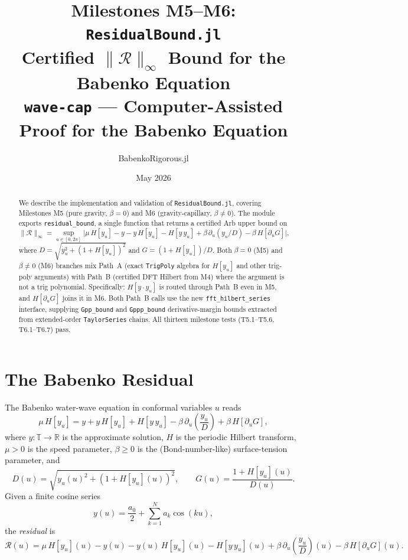 \documentclass[11pt]{article}
\title{\textbf{Milestones M5--M6: \texttt{ResidualBound.jl}}\\[0.4em]
\large Certified $\|\mathcal{R}\|_\infty$ Bound for the Babenko Equation\\[0.2em]
\normalsize \texttt{wave-cap} --- Computer-Assisted Proof for the Babenko Equation}
\author{BabenkoRigorous.jl}
\date{May 2026}
\theoremstyle{definition}
\begin{document}
\maketitle

\begin{abstract}
We describe the implementation and validation of \texttt{ResidualBound.jl},
covering Milestones M5 (pure gravity, $\beta=0$) and M6 (gravity-capillary, $\beta\neq 0$).
The module exports \texttt{residual\_bound}, a single function that returns a certified
Arb upper bound on
\[
  \|\mathcal{R}\|_\infty
  = \sup_{u\in[0,2\pi]}
  \bigl|\mu\,H[y_u] - y - y\,H[y_u] - H[y\,y_u]
  + \beta\,\partial_u(y_u/D) - \beta\,H[\partial_u G]\bigr|,
\]
where $D = \sqrt{y_u^2+(1+H[y_u])^2}$ and $G=(1+H[y_u])/D$.
Both $\beta = 0$ (M5) and $\beta \neq 0$ (M6) branches mix Path~A (exact
\texttt{TrigPoly} algebra for $H[y_u]$ and other trig-poly arguments) with
Path~B (certified DFT Hilbert from M4) where the argument is not a trig
polynomial.  Specifically: $H[y\cdot y_u]$ is routed through Path~B even in
M5, and $H[\partial_u G]$ joins it in M6.  Both Path~B calls use the new
\texttt{fft\_hilbert\_series} interface, supplying \texttt{Gpp\_bound} and
\texttt{Gppp\_bound} derivative-margin bounds extracted from extended-order
\texttt{TaylorSeries} chains.  All thirteen milestone tests
(T5.1--T5.6, T6.1--T6.7) pass.
\end{abstract}

\tableofcontents
\bigskip

\section{The Babenko Residual}

The Babenko water-wave equation in conformal variables $u$ reads
\begin{equation}\label{eq:babenko}
  \mu\,H[y_u] = y + y\,H[y_u] + H[y\,y_u]
  - \beta\,\partial_u\!\left(\frac{y_u}{D}\right)
  + \beta\,H\!\left[\partial_u G\right],
\end{equation}
where $y:\mathbb{T}\to\mathbb{R}$ is the approximate solution, $H$ is the periodic
Hilbert transform, $\mu>0$ is the speed parameter, $\beta\geq 0$ is the (Bond-number-like)
surface-tension parameter, and
\[
  D(u) = \sqrt{y_u(u)^2 + (1+H[y_u](u))^2}, \qquad
  G(u) = \frac{1+H[y_u](u)}{D(u)}.
\]
Given a finite cosine series
\[
  y(u) = \frac{a_0}{2} + \sum_{k=1}^{N} a_k\cos(ku),
\]
the \emph{residual} is
\begin{equation}\label{eq:residual}
  \mathcal{R}(u)
  = \mu\,H[y_u](u) - y(u) - y(u)\,H[y_u](u) - H[y\,y_u](u)
  + \beta\,\partial_u\!\left(\frac{y_u}{D}\right)(u)
  - \beta\,H[\partial_u G](u).
\end{equation}
\end{document}
